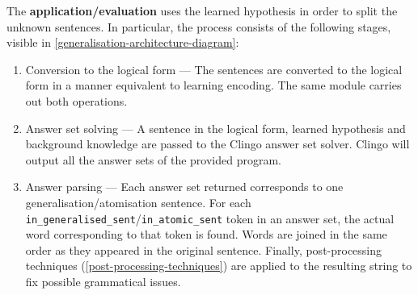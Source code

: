 The \textbf{application/evaluation} uses the learned hypothesis in order to split the unknown sentences.
In particular, the process consists of the following stages, visible in \ref{generalisation-architecture-diagram}:
\begin{enumerate}
    \item Conversion to the logical form --- The sentences are converted to the logical form in a manner equivalent to learning encoding. The same module carries out both operations.
    
    \item Answer set solving --- A sentence in the logical form, learned hypothesis and background knowledge are passed to the Clingo answer set solver. Clingo will output all the answer sets of the provided program.
    
    \item Answer parsing --- Each answer set returned corresponds to one generalisation/atomisation sentence. For each \verb+in_generalised_sent+/\verb+in_atomic_sent+ token in an answer set, the actual word corresponding to that token is found. Words are joined in the same order as they appeared in the original sentence. Finally, post-processing techniques (\ref{post-processing-techniques}) are applied to the resulting string to fix possible grammatical issues. 
\end{enumerate}

